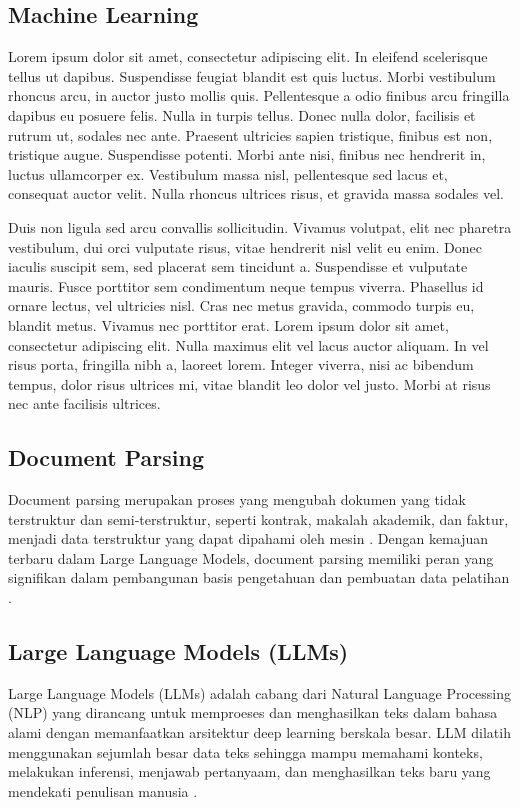 \documentclass{article} %
\begin{document}
\subsection{Machine Learning}
Lorem ipsum dolor sit amet, consectetur adipiscing elit. In eleifend scelerisque tellus ut dapibus. Suspendisse feugiat blandit est quis luctus. Morbi vestibulum rhoncus arcu, in auctor justo mollis quis. Pellentesque a odio finibus arcu fringilla dapibus eu posuere felis. Nulla in turpis tellus. Donec nulla dolor, facilisis et rutrum ut, sodales nec ante. Praesent ultricies sapien tristique, finibus est non, tristique augue. Suspendisse potenti. Morbi ante nisi, finibus nec hendrerit in, luctus ullamcorper ex. Vestibulum massa nisl, pellentesque sed lacus et, consequat auctor velit. Nulla rhoncus ultrices risus, et gravida massa sodales vel.

Duis non ligula sed arcu convallis sollicitudin. Vivamus volutpat, elit nec pharetra vestibulum, dui orci vulputate risus, vitae hendrerit nisl velit eu enim. Donec iaculis suscipit sem, sed placerat sem tincidunt a. Suspendisse et vulputate mauris. Fusce porttitor sem condimentum neque tempus viverra. Phasellus id ornare lectus, vel ultricies nisl. Cras nec metus gravida, commodo turpis eu, blandit metus. Vivamus nec porttitor erat. Lorem ipsum dolor sit amet, consectetur adipiscing elit. Nulla maximus elit vel lacus auctor aliquam. In vel risus porta, fringilla nibh a, laoreet lorem. Integer viverra, nisi ac bibendum tempus, dolor risus ultrices mi, vitae blandit leo dolor vel justo. Morbi at risus nec ante facilisis ultrices.

\subsection{Document Parsing}
Document parsing merupakan proses yang mengubah dokumen yang tidak terstruktur dan semi-terstruktur, seperti kontrak, makalah akademik, dan faktur, menjadi data terstruktur yang dapat dipahami oleh mesin \cite{b10}. Dengan kemajuan terbaru dalam Large Language Models, document parsing memiliki peran yang signifikan dalam pembangunan basis pengetahuan dan pembuatan data pelatihan \cite{b10}.

\subsection{Large Language Models (LLMs)}
Large Language Models (LLMs) adalah cabang dari Natural Language Processing (NLP) yang dirancang untuk memproeses dan menghasilkan teks dalam bahasa alami dengan memanfaatkan arsitektur deep learning berskala besar. LLM dilatih menggunakan sejumlah besar data teks sehingga mampu memahami konteks, melakukan inferensi, menjawab pertanyaam, dan menghasilkan teks baru yang mendekati penulisan manusia \cite{b6, b7}.
\end{document}
